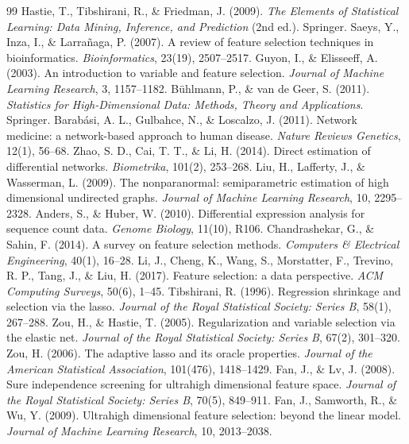 \documentclass[11pt]{article}
\begin{document}

\begin{thebibliography}{99}
\small
{} Hastie, T., Tibshirani, R., \& Friedman, J. (2009). \textit{The Elements of Statistical Learning: Data Mining, Inference, and Prediction} (2nd ed.). Springer.
 Saeys, Y., Inza, I., \& Larra\~naga, P. (2007). A review of feature selection techniques in bioinformatics. \textit{Bioinformatics}, 23(19), 2507--2517.
 Guyon, I., \& Elisseeff, A. (2003). An introduction to variable and feature selection. \textit{Journal of Machine Learning Research}, 3, 1157--1182.
 B\"uhlmann, P., \& van de Geer, S. (2011). \textit{Statistics for High-Dimensional Data: Methods, Theory and Applications}. Springer.
 Barab\'asi, A. L., Gulbahce, N., \& Loscalzo, J. (2011). Network medicine: a network-based approach to human disease. \textit{Nature Reviews Genetics}, 12(1), 56--68.
 Zhao, S. D., Cai, T. T., \& Li, H. (2014). Direct estimation of differential networks. \textit{Biometrika}, 101(2), 253--268.
 Liu, H., Lafferty, J., \& Wasserman, L. (2009). The nonparanormal: semiparametric estimation of high dimensional undirected graphs. \textit{Journal of Machine Learning Research}, 10, 2295--2328.
 Anders, S., \& Huber, W. (2010). Differential expression analysis for sequence count data. \textit{Genome Biology}, 11(10), R106.
 Chandrashekar, G., \& Sahin, F. (2014). A survey on feature selection methods. \textit{Computers \& Electrical Engineering}, 40(1), 16--28.
 Li, J., Cheng, K., Wang, S., Morstatter, F., Trevino, R. P., Tang, J., \& Liu, H. (2017). Feature selection: a data perspective. \textit{ACM Computing Surveys}, 50(6), 1--45.
 Tibshirani, R. (1996). Regression shrinkage and selection via the lasso. \textit{Journal of the Royal Statistical Society: Series B}, 58(1), 267--288.
 Zou, H., \& Hastie, T. (2005). Regularization and variable selection via the elastic net. \textit{Journal of the Royal Statistical Society: Series B}, 67(2), 301--320.
 Zou, H. (2006). The adaptive lasso and its oracle properties. \textit{Journal of the American Statistical Association}, 101(476), 1418--1429.
 Fan, J., \& Lv, J. (2008). Sure independence screening for ultrahigh dimensional feature space. \textit{Journal of the Royal Statistical Society: Series B}, 70(5), 849--911.
 Fan, J., Samworth, R., \& Wu, Y. (2009). Ultrahigh dimensional feature selection: beyond the linear model. \textit{Journal of Machine Learning Research}, 10, 2013--2038.

\end{thebibliography}
\end{document}
